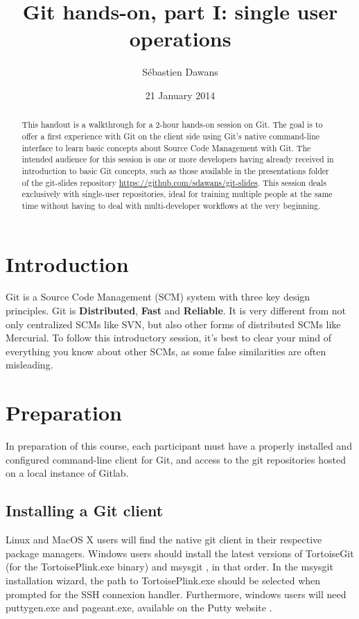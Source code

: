 \documentclass{tufte-handout}
\title{Git hands-on, part I: single user operations}
\author{S\'ebastien Dawans}
\date{21 January 2014} %
\begin{document}
\maketitle%

\begin{abstract}
\noindent
This handout is a walkthrough for a 2-hour hands-on session on Git.
The goal is to offer a first experience with Git on the client side using Git's native command-line interface to learn basic concepts about Source Code Management with Git.
The intended audience for this session is one or more developers having already received in introduction to basic Git concepts, such as those available in the presentations folder of the git-slides repository \url{https://github.com/sdawans/git-slides}.
This session deals exclusively with single-user repositories, ideal for training multiple people at the same time without having to deal with multi-developer workflows at the very beginning.
\end{abstract}


\section{Introduction}\label{sec:intro}

Git is a Source Code Management (SCM) system with three key design principles.
Git is \textbf{Distributed}, \textbf{Fast} and \textbf{Reliable}.
It is very different from not only centralized SCMs like SVN, but also other forms of distributed SCMs like Mercurial.
To follow this introductory session, it's best to clear your mind of everything you know about other SCMs, as some false similarities are often misleading.

\section{Preparation}

In preparation of this course, each participant must have a properly installed and configured command-line client for Git, and access to the git repositories hosted on a local instance of Gitlab.

\subsection{Installing a Git client}\label{sec:preparation}

Linux and MacOS X users will find the native git client in their respective package managers.
Windows users should install the latest versions of TortoiseGit  (for the TortoisePlink.exe binary) and msysgit , in that order.
In the msysgit installation wizard, the path to TortoisePlink.exe should be selected when prompted for the SSH connexion handler.
Furthermore, windows users will need puttygen.exe and pageant.exe, available on the Putty website .
\end{document}
